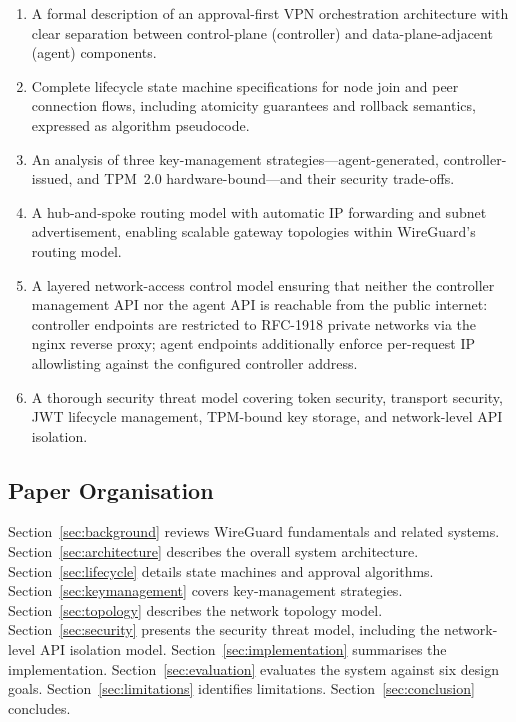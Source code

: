 \documentclass[conference]{IEEEtran}
\begin{document}
\begin{enumerate}
  \item A formal description of an approval-first VPN orchestration architecture
        with clear separation between control-plane (controller) and
        data-plane-adjacent (agent) components.
  \item Complete lifecycle state machine specifications for node join and peer
        connection flows, including atomicity guarantees and rollback semantics,
        expressed as algorithm pseudocode.
  \item An analysis of three key-management strategies---agent-generated,
        controller-issued, and TPM~2.0 hardware-bound---and their security
        trade-offs.
  \item A hub-and-spoke routing model with automatic IP forwarding and subnet
        advertisement, enabling scalable gateway topologies within WireGuard's
        routing model.
  \item A layered network-access control model ensuring that neither the
        controller management API nor the agent API is reachable from the public
        internet: controller endpoints are restricted to RFC-1918 private
        networks via the nginx reverse proxy; agent endpoints additionally enforce
        per-request IP allowlisting against the configured controller address.
  \item A thorough security threat model covering token security, transport
        security, JWT lifecycle management, TPM-bound key storage, and
        network-level API isolation.
\end{enumerate}

\subsection{Paper Organisation}

Section~\ref{sec:background} reviews WireGuard fundamentals and related systems.
Section~\ref{sec:architecture} describes the overall system architecture.
Section~\ref{sec:lifecycle} details state machines and approval algorithms.
Section~\ref{sec:keymanagement} covers key-management strategies.
Section~\ref{sec:topology} describes the network topology model.
Section~\ref{sec:security} presents the security threat model, including the
network-level API isolation model.
Section~\ref{sec:implementation} summarises the implementation.
Section~\ref{sec:evaluation} evaluates the system against six design goals.
Section~\ref{sec:limitations} identifies limitations.
Section~\ref{sec:conclusion} concludes.
\end{document}
